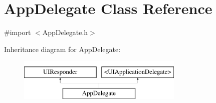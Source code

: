 \hypertarget{interface_app_delegate}{}\section{App\+Delegate Class Reference}
\label{interface_app_delegate}


{\ttfamily \#import $<$App\+Delegate.\+h$>$}

Inheritance diagram for App\+Delegate\+:\begin{figure}[H]
\begin{center}
\leavevmode
\includegraphics[height=2.000000cm]{interface_app_delegate}
\end{center}
\end{figure}
